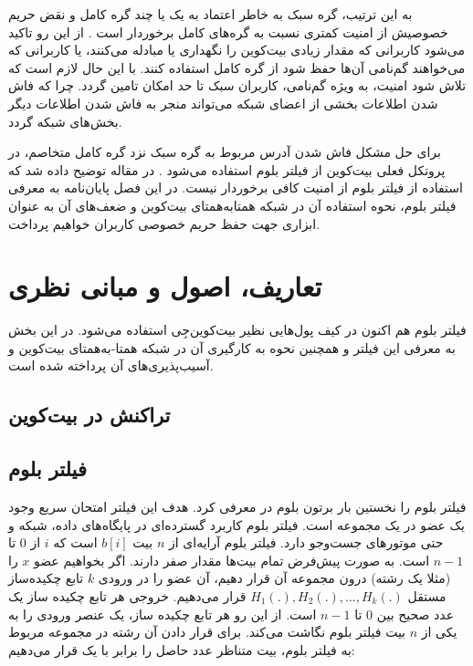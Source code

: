 به این ترتیب،‌ گره سبک به خاطر اعتماد به یک یا چند گره کامل و نقض حریم خصوصیش از امنیت کمتری نسبت به گره‌های کامل برخوردار است \cite{Sompolinsky2016}. از این رو تاکید می‌شود کاربرانی که مقدار زیادی بیت‌کوین را نگهداری یا مبادله می‌کنند، یا کاربرانی که می‌خواهند گم‌نامی آن‌ها حفظ شود از گره‌ کامل استفاده کنند. با این حال لازم است که تلاش شود امنیت، به ویژه گم‌نامی، کاربران سبک تا حد امکان تامین گردد. چرا که فاش شدن اطلاعات بخشی از اعضای شبکه می‌تواند منجر به فاش شدن اطلاعات دیگر بخش‌های شبکه گردد.

برای حل مشکل فاش شدن آدرس مربوط به گره سبک نزد گره کامل متخاصم، در پروتکل فعلی بیت‌کوین از فیلتر بلوم استفاده می‌شود \cite{Hearn2013}. در مقاله \cite{Gervais2014} توضیح داده ‌شد که استفاده از فیلتر بلوم از امنیت کافی برخوردار نیست. در این فصل پایان‌نامه به معرفی فیلتر بلوم، نحوه استفاده آن در شبکه همتا‌به‌همتای بیت‌کوین و ضعف‌های آن به عنوان ابزاری جهت حفظ حریم خصوصی کاربران خواهیم پرداخت.

\section{تعاریف، اصول و مبانی نظری}
فیلتر بلوم هم اکنون در کیف پول‌هایی نظیر بیت‌کوین‌جِی \cite{bitcoinj} استفاده می‌شود. در این بخش به معرفی این فیلتر و همچنین نحوه به کارگیری آن در شبکه همتا-به‌همتای بیت‌کوین و آسیب‌پذیری‌های آن پرداخته شده است.

\subsection{تراکنش‌ در بیت‌کوین}

\subsection{فیلتر بلوم}
فیلتر بلوم را نخستین بار برتون بلوم در \cite{Bloom1970} معرفی کرد. هدف این فیلتر امتحان سریع وجود یک عضو در یک مجموعه است. فیلتر بلوم کاربرد گسترده‌ای در پایگاه‌های داده، شبکه و حتی موتور‌های جست‌وجو دارد. فیلتر بلوم آرایه‌ای از $n$ بیت $b[i]$ است که $i$ از $0$ تا$n-1$ است. به صورت پیش‌فرض تمام بیت‌ها مقدار صفر دارند. اگر بخواهیم عضو $x$ را (مثلا یک رشته) درون مجموعه آن قرار دهیم، آن عضو را در ورودی $k$ تابع چکیده‌ساز مستقل
$H_1(.), H_2(.), ..., H_k(.)$
قرار می‌دهیم. خروجی هر تابع چکیده ساز یک عدد صحیح بین $0$ تا $n-1$ است. از این رو هر تابع چکیده ساز، یک عنصر ورودی را به یکی از	 $n$ بیت فیلتر بلوم نگاشت می‌کند. برای قرار دادن آن رشته در مجموعه مربوط به فیلتر بلوم، بیت متناظر عدد حاصل را برابر با یک قرار می‌دهیم: 

